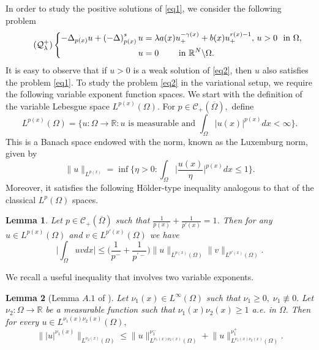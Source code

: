 \documentclass[11pt]{article}
\newtheorem{lemma}{Lemma}[section] %
\newcommand{\om} {\Omega}
\newcommand{\De} {\Delta}
\newcommand{\ra} {\rightarrow}
\newcommand{\real}{\mathbb{R}}
\newcommand{\rnn}{\mathbb{R}^{N}}
\newcommand{\lv}{\lVert}
\newcommand{\rv}{\rVert}
\newcommand{\lb}{\left(}
\newcommand{\rb}{\right)}
\begin{document}
 In order to study the positive solutions of 
\eqref{eq1}, we consider the following problem
\begin{equation}\label{eq2}\tag{$\mathcal{Q}^+_{\lambda}$}
   \left\{
	\begin{aligned}
		-\De_{p(x)}u+\lb -\De \rb^s_{p(x)}u 
&=\lambda a(x)u_+^{-\gamma(x)}+b(x)u_+^{r(x)-1},\,
 u>0 \  \text{ in } \om,\\
u &= 0 \qquad \text{ in } \rnn\backslash\om.
	\end{aligned}
    \right.
\end{equation}
It is easy to observe that if
$u>0$
is a weak solution of \eqref{eq2}, then
$u$
also satisfies the problem \eqref{eq1}.
To study the problem \eqref{eq2} in the variational setup, 
we require the following variable exponent function spaces.
We start with the definition of the variable Lebesgue space
$L^{p(x)}(\om).$
For
$p\in \mathcal{C}_+(\overline{\Omega}),$
define 
\begin{equation*}
    L^{p(x)}(\om) = 
\Big \{ u : \om \to \real : u  
    \text{ is measurable and } 
\int_\om|u(x)|^{p(x)}dx < \infty 
\Big \}.
\end{equation*}
This is a Banach space endowed with the norm, 
known as the Luxemburg norm, given by
\begin{equation*}
    \lv u \rv_{L^{p(x)}} = \inf
\Big \{ \eta > 0  : 
\int_{\om}
\Big | 
\frac{u(x)}{\eta} 
\Big |^{p(x)} dx \le 1 
\Big \}.
\end{equation*}
Moreover, it satisfies the following 
H\"{o}lder-type inequality analogous to 
that of the classical
$L^p{(\om)}$
spaces.

\begin{lemma}
	Let
$p\in \mathcal{C}_+(\overline{\Omega})$
such that
$ 
\frac{1}{p(x)} + 
\frac {1}{p'(x)}=1$.
	Then for any 
$u \in L^{p(x)}(\Omega)$
and
$
v\in L^{p'(x)}(\Omega)$
we have
$$
\Big | 
\int_{\Omega} uv dx 
\Big |\leq \Big(
\frac{1}{p^{-}} + 
\frac{1}{p^{'-}} \Big) \lv u \rv_{L^{p(x)}(\Omega)}
	\lv v \rv_{L^{p'(x)}(\Omega)}.
$$
\end{lemma}

 We recall a useful inequality 
that involves two variable exponents.

\begin{lemma}[Lemma $A.1$
of \cite{giacomoni_para_px}]\label{lemA1}
	Let
$\nu_1(x)\in L^\infty(\Omega)$
such that
$\nu_1\geq0,\; \nu_1\not\equiv 0.$
Let
$\nu_2:\Omega\ra\real$
be a measurable function 
	such that
$\nu_1(x)\nu_2(x)\geq 1$
a.e. in
$\Omega.$
Then for every
$u\in L^{\nu_1(x)\nu_2(x)}(\Omega),$
$$
	\lv |u|^{\nu_1(x)}\rv_{L^{\nu_2(x)}(\Omega)}\leq 
	\lv u\rv_{L^{\nu_1(x)\nu_2(x)}
(\Omega)}^{\nu_1^-}+\lv u
\rv_{L^{\nu_1(x)\nu_2(x)}(\Omega)}^{\nu_1^+}.
$$
\end{lemma}	
\end{document}
